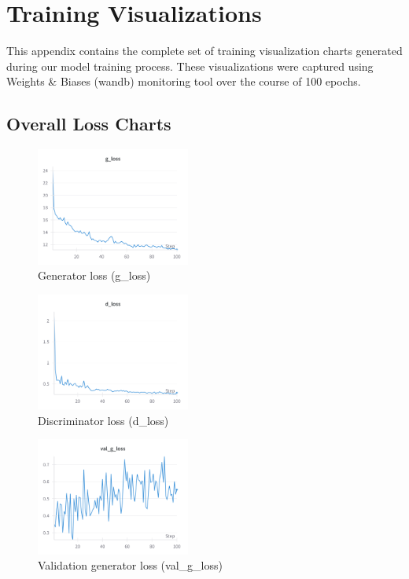 \documentclass[twocolumn,superscriptaddress,aps]{revtex4-1}
\begin{document}

\appendix
\section{Training Visualizations}

This appendix contains the complete set of training visualization charts generated during our model training process. These visualizations were captured using Weights \& Biases (wandb) monitoring tool over the course of 100 epochs.

\subsection{Overall Loss Charts}

\begin{figure}[H]
\centering
\includegraphics[width=0.45\textwidth]{assets/g_loss.png}
\caption{Generator loss (g\_loss)}
\label{fig:g_loss}
\end{figure}

\begin{figure}[H]
\centering
\includegraphics[width=0.45\textwidth]{assets/d_loss.png}
\caption{Discriminator loss (d\_loss)}
\label{fig:d_loss}
\end{figure}

\begin{figure}[H]
\centering
\includegraphics[width=0.45\textwidth]{assets/val_g_loss.png}
\caption{Validation generator loss (val\_g\_loss)}
\label{fig:val_g_loss}
\end{figure}
\end{document}
